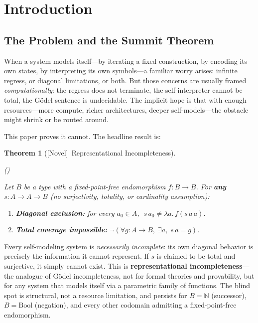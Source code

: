 \documentclass[11pt]{article}
\newtheorem{theorem}{Theorem}[section]
\newcommand{\novel}{\textcolor{blue!70!black}{[Novel]}}
\newcommand{\TheoremLeanTag}[1]{%
  \noindent\textnormal{(\leanref{#1})}\par\noindent}
\newcommand{\AfterTheoremHead}{\mbox{}\par}
\begin{document}
\section{Introduction}
\label{sec:intro}

\subsection{The Problem and the Summit Theorem}
When a system models itself---by iterating a fixed construction, by
encoding its own states, by interpreting its own symbols---a familiar worry
arises: infinite regress, or diagonal limitations, or both.  But those
concerns are usually framed \emph{computationally}: the regress does not
terminate, the self-interpreter cannot be total, the G\"odel sentence is
undecidable.  The implicit hope is that with enough resources---more
compute, richer architectures, deeper self-models---the obstacle might
shrink or be routed around.

This paper proves it cannot.  The headline result is:

\begin{theorem}[\novel\ Representational Incompleteness]
\label{thm:summit}
\AfterTheoremHead
\TheoremLeanTag{representational\_incompleteness}
Let $B$ be a type with a fixed-point-free endomorphism $f : B \to B$.
For \textbf{any} $s : A \to A \to B$ (no surjectivity, totality, or
cardinality assumption):
\begin{enumerate}[label=(\alph*)]
\item \textbf{Diagonal exclusion:}
  for every $a_0 \in A$,
  $\;s\,a_0 \neq \lambda a.\,f(s\,a\,a)$.
\item \textbf{Total coverage impossible:}
  $\neg\!\left(\forall g : A \to B,\;\exists a,\;s\,a = g\right)$.
\end{enumerate}
\end{theorem}

\noindent
Every self-modeling system is \emph{necessarily incomplete}: its own
diagonal behavior is precisely the information it cannot represent.  If
$s$ is claimed to be total and surjective, it simply cannot exist.  This
is \textbf{representational incompleteness}---the analogue of G\"odel
incompleteness, not for formal theories and provability, but for any
system that models itself via a parametric family of functions.  The
blind spot is structural, not a resource limitation, and persists for
$B = \mathbb{N}$ (successor), $B = \mathrm{Bool}$ (negation), and every
other codomain admitting a fixed-point-free endomorphism.
\end{document}
